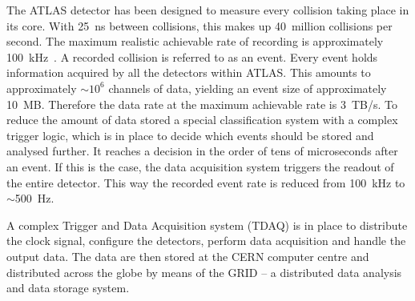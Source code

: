 The ATLAS detector has been designed to measure every collision taking place in its core. With 25~ns between collisions, this makes up 40~million collisions per second. The maximum realistic achievable rate of recording is approximately 100~kHz~\cite{Jenni:1193085}. A recorded collision is referred to as an event. Every event holds information acquired by all the detectors within ATLAS. This amounts to approximately $\sim$$10^6$ channels of data, yielding an event size of approximately 10~MB. Therefore the data rate at the maximum achievable rate is 3~TB/s. To reduce the amount of data stored a special classification system with a complex trigger logic, which is in place to decide which events should be stored and analysed further. It reaches a decision in the order of tens of microseconds after an event. If this is the case, the data acquisition system triggers the readout of the entire detector. This way the recorded event rate is reduced from 100~kHz to $\sim$500~Hz.

A complex Trigger and Data Acquisition system (TDAQ) is in place to distribute the clock signal, configure the detectors, perform data acquisition and handle the output data. The data are then stored at the CERN computer centre and distributed across the globe by means of the GRID -- a distributed data analysis and data storage system.



